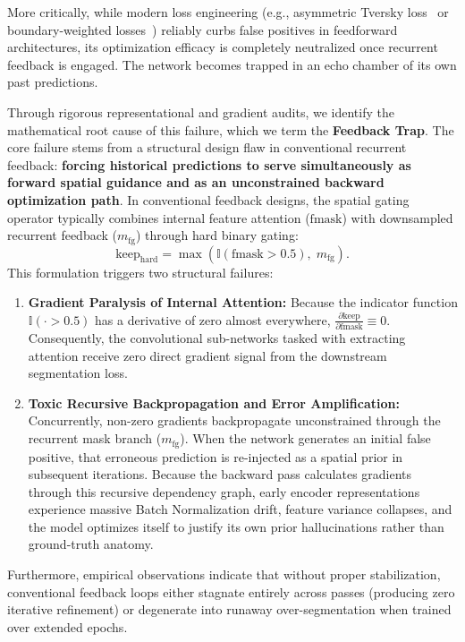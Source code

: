 More critically, while modern loss engineering (e.g., asymmetric Tversky loss~\cite{salehi2017tversky} or boundary-weighted losses~\cite{kervadec2019boundary}) reliably curbs false positives in feedforward architectures, its optimization efficacy is completely neutralized once recurrent feedback is engaged. The network becomes trapped in an echo chamber of its own past predictions. 

Through rigorous representational and gradient audits, we identify the mathematical root cause of this failure, which we term the \textbf{Feedback Trap}. The core failure stems from a structural design flaw in conventional recurrent feedback: \textbf{forcing historical predictions to serve simultaneously as forward spatial guidance and as an unconstrained backward optimization path}. In conventional feedback designs, the spatial gating operator typically combines internal feature attention ($\text{fmask}$) with downsampled recurrent feedback ($m_{\text{fg}}$) through hard binary gating:
\begin{equation}
  \label{eq:hard_gate_intro}
  \text{keep}_{\text{hard}} = \max\left(\mathbb{I}(\text{fmask} > 0.5),\; m_{\text{fg}}\right).
\end{equation}
This formulation triggers two structural failures:
\begin{enumerate}
  \item \textbf{Gradient Paralysis of Internal Attention:} Because the indicator function $\mathbb{I}(\cdot > 0.5)$ has a derivative of zero almost everywhere, $\frac{\partial \text{keep}}{\partial \text{fmask}} \equiv 0$. Consequently, the convolutional sub-networks tasked with extracting attention receive zero direct gradient signal from the downstream segmentation loss.
  \item \textbf{Toxic Recursive Backpropagation and Error Amplification:} Concurrently, non-zero gradients backpropagate unconstrained through the recurrent mask branch ($m_{\text{fg}}$). When the network generates an initial false positive, that erroneous prediction is re-injected as a spatial prior in subsequent iterations. Because the backward pass calculates gradients through this recursive dependency graph, early encoder representations experience massive Batch Normalization drift, feature variance collapses, and the model optimizes itself to justify its own prior hallucinations rather than ground-truth anatomy.
\end{enumerate}

Furthermore, empirical observations indicate that without proper stabilization, conventional feedback loops either stagnate entirely across passes (producing zero iterative refinement) or degenerate into runaway over-segmentation when trained over extended epochs.


